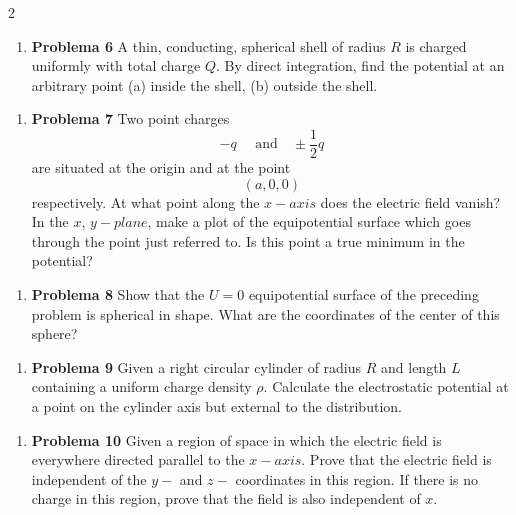 \documentclass{article}
\begin{document}
\begin{multicols}{2}
\begin{enumerate}[label={{\textcolor{trueblue}{\textbf{Pr.} \arabic*.6}}}, start=2]
		\item \textbf{Problema 6}  A thin, conducting, spherical shell of radius $R$ is charged uniformly with total charge $Q$. By direct integration, find the potential at an arbitrary point (a) inside the shell, (b) outside the shell.
\end{enumerate}	

\begin{enumerate}[label={{\textcolor{trueblue}{\textbf{Pr.} \arabic*.7}}}, start=2]
		\item \textbf{Problema 7}  Two point charges \[ -q \quad \text{ and} \quad \pm \frac{1}{2}q \] are situated at the origin and at the point \[(a,0,0)\] respectively. At what point along the $x-axis$ does the electric field vanish?  In the $x$, $y-plane$, make a plot of the equipotential surface which goes through the point just referred to. Is this point a true minimum in the potential?
\end{enumerate}	

\begin{enumerate}[label={{\textcolor{trueblue}{\textbf{Pr.} \arabic*.8}}}, start=2]
		\item \textbf{Problema 8}  Show that the $U=0$ equipotential surface of the preceding problem is spherical in shape. What are the coordinates of the center of this sphere? 
\end{enumerate}	

\begin{enumerate}[label={{\textcolor{trueblue}{\textbf{Pr.} \arabic*.9}}}, start=2]
		\item \textbf{Problema 9} Given a right circular cylinder of radius $R$ and length $L$ containing a uniform charge density $\rho$. Calculate the electrostatic potential at a point on the cylinder axis but external to the distribution.
\end{enumerate}	

\begin{enumerate}[label={{\textcolor{trueblue}{\textbf{Pr.} \arabic*.10}}}, start=2]
		\item \textbf{Problema 10} Given a region of space in which the electric field is everywhere directed parallel to the $x-axis$. Prove that the  electric field is independent of the $y-$ and $z-$ coordinates in this region. If there is no charge in this region, prove that the field is also independent of $x$.
\end{enumerate}	


\end{multicols}
\end{document}
